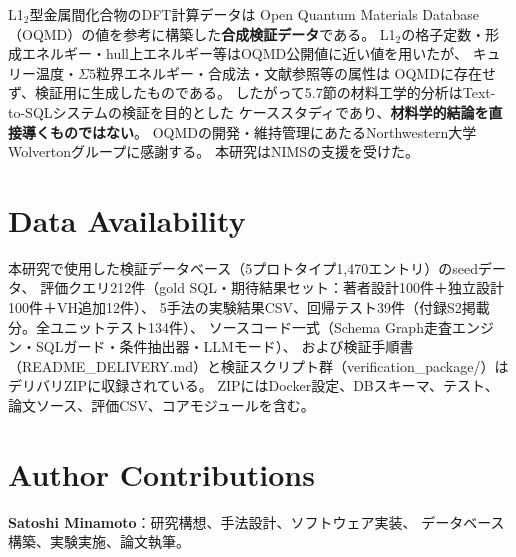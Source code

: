 \documentclass[5p,twocolumn]{elsarticle}
\begin{document}
L1$_2$型金属間化合物のDFT計算データは
Open Quantum Materials Database（OQMD）の値を参考に構築した\textbf{合成検証データ}である。
L1$_2$の格子定数・形成エネルギー・hull上エネルギー等はOQMD公開値に近い値を用いたが、
キュリー温度・$\Sigma 5$粒界エネルギー・合成法・文献参照等の属性は
OQMDに存在せず、検証用に生成したものである。
したがって5.7節の材料工学的分析はText-to-SQLシステムの検証を目的とした
ケーススタディであり、\textbf{材料学的結論を直接導くものではない}。
OQMDの開発・維持管理にあたるNorthwestern大学Wolvertonグループに感謝する。
本研究はNIMSの支援を受けた。

\section*{Data Availability}

本研究で使用した検証データベース（5プロトタイプ1{,}470エントリ）のseedデータ、
評価クエリ212件（gold SQL・期待結果セット：著者設計100件＋独立設計100件＋VH追加12件）、
5手法の実験結果CSV、回帰テスト39件（付録S2掲載分。全ユニットテスト134件）、
ソースコード一式（Schema Graph走査エンジン・SQLガード・条件抽出器・LLMモード）、
および検証手順書（README\_DELIVERY.md）と検証スクリプト群（verification\_package/）は
デリバリZIPに収録されている。
ZIPにはDocker設定、DBスキーマ、テスト、論文ソース、評価CSV、コアモジュールを含む。

\section*{Author Contributions}

\textbf{Satoshi Minamoto}：研究構想、手法設計、ソフトウェア実装、
データベース構築、実験実施、論文執筆。




\clearpage
\onecolumn
\appendix
\renewcommand{\thesection}{S\arabic{section}}
\renewcommand{\thetable}{S\arabic{table}}
\renewcommand{\thefigure}{S\arabic{figure}}
\renewcommand{\theequation}{S\arabic{equation}}
\setcounter{section}{0}
\setcounter{table}{0}
\setcounter{figure}{0}
\setcounter{equation}{0}
\end{document}
